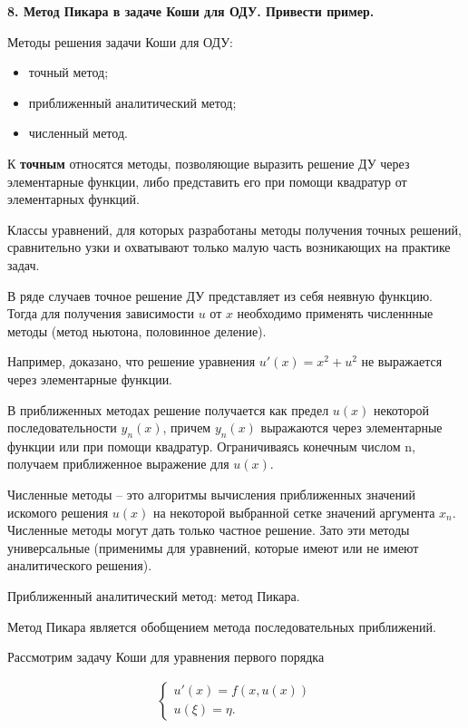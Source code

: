 \documentclass[a4paper,14pt]{article}
\begin{document}
\textbf{8. Метод Пикара в задаче Коши для  ОДУ.  Привести пример.}

Методы решения задачи Коши для ОДУ:

\begin{itemize}
	\item точный метод;
	\item приближенный аналитический метод;
	\item численный метод.
\end{itemize}

К \textbf{точным} относятся методы, позволяющие выразить решение ДУ 
через элементарные функции, либо представить его при помощи квадратур от
элементарных функций.

Классы уравнений, для которых разработаны методы получения точных решений, сравнительно 
узки и охватывают только малую часть возникающих на практике задач.

В ряде случаев точное решение ДУ представляет из себя неявную
функцию. Тогда для получения зависимости $u$ от $x$ необходимо применять численнные
методы (метод ньютона, половинное деление).

Например, доказано, что решение уравнения $u'(x) = x^2 + u^2$ не выражается через элементарные
функции.

В приближенных методах решение получается как предел $u(x)$ некоторой
последовательности $y_n(x)$, причем $y_n(x)$ выражаются через элементарные функции
или при помощи квадратур. Ограничиваясь конечным числом n, получаем приближенное
выражение для $u(x)$.

Численные методы -- это алгоритмы вычисления приближенных значений искомого решения
$u(x)$ на некоторой выбранной сетке значений аргумента $x_n$. Численные методы
могут дать только частное решение. Зато эти методы универсальные (применимы для уравнений,
которые имеют или не имеют аналитического решения).

Приближенный аналитический метод: метод Пикара.

Метод Пикара является обобщением метода последовательных приближений.

Рассмотрим задачу Коши для уравнения первого порядка

\begin{eqnarray}
	\begin{cases}
		u'(x) = f(x, u(x)) \\
	u(\xi) = \eta.
	\end{cases}
\end{eqnarray}
\end{document}
